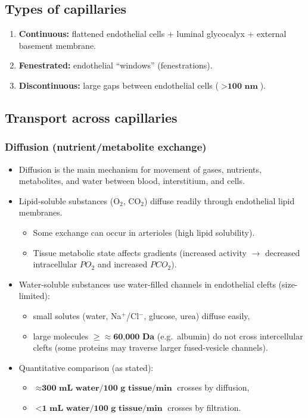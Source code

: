 \documentclass[11pt,a4paper]{article}
\begin{document}
\subsection{Types of capillaries}
\begin{enumerate}
\item \textbf{Continuous:} flattened endothelial cells + luminal glycocalyx + external basement membrane.
\item \textbf{Fenestrated:} endothelial ``windows'' (fenestrations).
\item \textbf{Discontinuous:} large gaps between endothelial cells ($>\textbf{100 nm}$).
\end{enumerate}

\subsection{Transport across capillaries}

\subsubsection{Diffusion (nutrient/metabolite exchange)}
\begin{itemize}
\item Diffusion is the main mechanism for movement of gases, nutrients, metabolites, and water between blood, interstitium, and cells.
\item Lipid-soluble substances (O$_2$, CO$_2$) diffuse readily through endothelial lipid membranes.
  \begin{itemize}
  \item Some exchange can occur in arterioles (high lipid solubility).
  \item Tissue metabolic state affects gradients (increased activity $\rightarrow$ decreased intracellular $P\!O_2$ and increased $P\!CO_2$).
  \end{itemize}
\item Water-soluble substances use water-filled channels in endothelial clefts (size-limited):
  \begin{itemize}
  \item small solutes (water, Na$^+$/Cl$^-$, glucose, urea) diffuse easily,
  \item large molecules $\geq \approx \textbf{60{,}000 Da}$ (e.g.\ albumin) do not cross intercellular clefts (some proteins may traverse larger fused-vesicle channels).
  \end{itemize}
\item Quantitative comparison (as stated):
  \begin{itemize}
  \item $\approx \textbf{300 mL water/100 g tissue/min}$ crosses by diffusion,
  \item $< \textbf{1 mL water/100 g tissue/min}$ crosses by filtration.
  \end{itemize}
\end{itemize}
\end{document}
